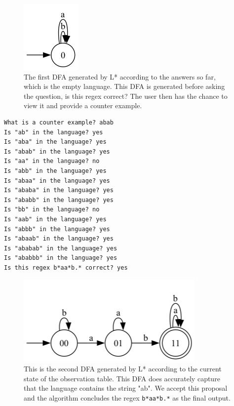 \begin{figure}[H]
	\centering
	\includegraphics{figures/empty_lang.png}
	\captionsetup{justification=centering}
	\captionsetup{format=hang}
	\singlespace
	\caption{The first DFA generated by L* according to the answers so far, which is the empty language. This DFA is generated before asking the question, is this regex correct? The user then has the chance to view it and provide a counter example.}
	\label{fig:empty_lang}
\end{figure}

\begin{lstlisting}
What is a counter example? abab
Is "ab" in the language? yes
Is "aba" in the language? yes
Is "abab" in the language? yes
Is "aa" in the language? no
Is "abb" in the language? yes
Is "abaa" in the language? yes
Is "ababa" in the language? yes
Is "ababb" in the language? yes
Is "bb" in the language? no
Is "aab" in the language? yes
Is "abbb" in the language? yes
Is "abaab" in the language? yes
Is "ababab" in the language? yes
Is "ababbb" in the language? yes
Is this regex b*aa*b.* correct? yes
\end{lstlisting}

\begin{figure}[H]
\centering
\includegraphics{figures/contains_ab.png}
\captionsetup{justification=centering}
\captionsetup{format=hang}
\singlespace
\caption{This is the second DFA generated by L* according to the current state of the observation table. This DFA does accurately capture that the language contains the string "ab". We accept this proposal and the algorithm concludes the regex \texttt{b*aa*b.*} as the final output.}
\label{fig:contains_ab}
\end{figure}

